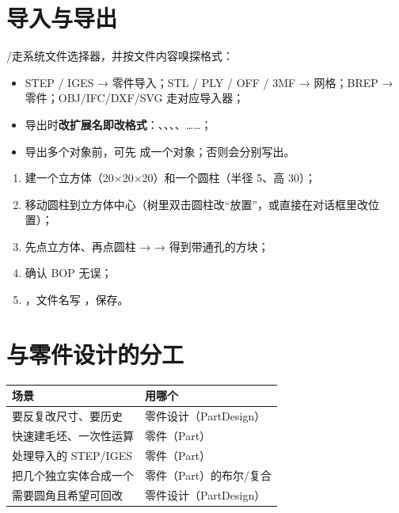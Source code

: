 \section{导入与导出}

/走系统文件选择器，并按文件内容嗅探格式：

\begin{itemize}
  \item STEP / IGES → 零件导入；STL / PLY / OFF / 3MF → 网格；BREP → 零件；OBJ/IFC/DXF/SVG 走对应导入器；
  \item 导出时\textbf{改扩展名即改格式}：、、、、……；
  \item 导出多个对象前，可先  成一个对象；否则会分别写出。
\end{itemize}

\begin{practice}[练习：布尔求差与导出]
\begin{enumerate}
  \item 建一个立方体（20×20×20）和一个圆柱（半径 5、高 30）；
  \item 移动圆柱到立方体中心（树里双击圆柱改“放置”，或直接在对话框里改位置）；
  \item 先点立方体、再点圆柱 →  → 得到带通孔的方块；
  \item {} 确认 BOP 无误；
  \item {}，文件名写 ，保存。
\end{enumerate}
\end{practice}

\section{与零件设计的分工}

\begin{center}
\small
\begin{tabularx}{\linewidth}{@{}lX@{}}
\toprule
\textbf{场景} & \textbf{用哪个} \\
\midrule
要反复改尺寸、要历史 & 零件设计（PartDesign）\\
快速建毛坯、一次性运算 & 零件（Part）\\
处理导入的 STEP/IGES & 零件（Part）\\
把几个独立实体合成一个 & 零件（Part）的布尔/复合 \\
需要圆角且希望可回改 & 零件设计（PartDesign）\\
\bottomrule
\end{tabularx}
\end{center}
